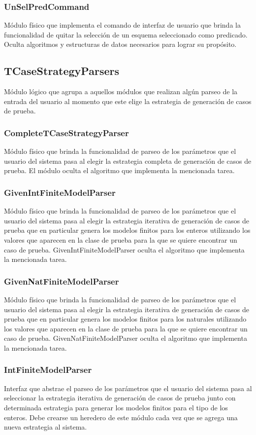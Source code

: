 \documentclass[a4paper,10pt]{report}
\begin{document}
			\subsubsection{UnSelPredCommand}
			Módulo físico que implementa el comando de interfaz de usuario que brinda la funcionalidad de quitar la selección de un esquema seleccionado como predicado. Oculta algoritmos y estructuras de datos necesarios para lograr su propósito.
		\subsection{TCaseStrategyParsers}
		Módulo lógico que agrupa a aquellos módulos que realizan algún parseo de la entrada del usuario al momento que este elige la estrategia de generación de casos de prueba.
			\subsubsection{CompleteTCaseStrategyParser}
			Módulo físico que brinda la funcionalidad de parseo de los parámetros que el usuario del sistema pasa al elegir la estrategia completa de generación de casos de prueba. El módulo oculta el algoritmo que implementa la mencionada tarea.
			\subsubsection{GivenIntFiniteModelParser}
			Módulo físico que brinda la funcionalidad de parseo de los parámetros que el usuario del sistema pasa al elegir la estrategia iterativa de generación de casos de prueba que en particular genera los modelos finitos para los enteros utilizando los valores que aparecen en la clase de prueba para la que se quiere encontrar un caso de prueba. GivenIntFiniteModelParser oculta el algoritmo que implementa la mencionada tarea.
			\subsubsection{GivenNatFiniteModelParser}
			Módulo físico que brinda la funcionalidad de parseo de los parámetros que el usuario del sistema pasa al elegir la estrategia iterativa de generación de casos de prueba que en particular genera los modelos finitos para los naturales utilizando los valores que aparecen en la clase de prueba para la que se quiere encontrar un caso de prueba. GivenNatFiniteModelParser oculta el algoritmo que implementa la mencionada tarea.
			\subsubsection{IntFiniteModelParser}
			Interfaz que abstrae el parseo de los parámetros que el usuario del sistema pasa al seleccionar la estrategia iterativa de generación de casos de prueba junto con determinada estrategia para generar los modelos finitos para el tipo de los enteros. Debe crearse un heredero de este módulo cada vez que se agrega una nueva estrategia al sistema.
\end{document}
